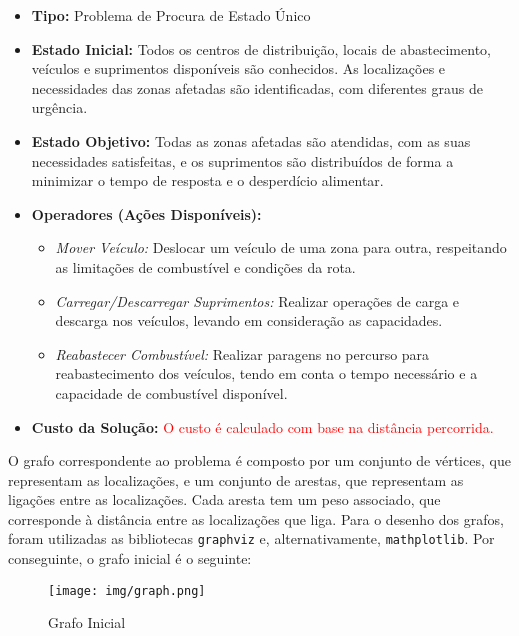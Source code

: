 \documentclass[a4paper,12pt]{scrreprt}
\begin{document}
\begin{itemize}
    \item\textbf{Tipo:} Problema de Procura de Estado Único
    \item\textbf{Estado Inicial:} Todos os centros de distribuição, locais de abastecimento,
    veículos e suprimentos disponíveis são conhecidos.
     As localizações e necessidades das zonas afetadas são identificadas, com diferentes graus de urgência.
    \item\textbf{Estado Objetivo:} Todas as zonas afetadas são atendidas, com as suas necessidades satisfeitas, e os suprimentos
    são distribuídos de forma a minimizar o tempo de resposta e o desperdício alimentar.
        \item\textbf{Operadores (Ações Disponíveis):} 
        \begin{itemize}
                \item\textit{Mover Veículo:} Deslocar um veículo de uma zona para outra, respeitando as limitações de combustível e condições da rota.
                \item\textit{Carregar/Descarregar Suprimentos:} Realizar operações de carga e descarga nos veículos, levando em consideração as capacidades.
                \item\textit{Reabastecer Combustível:} Realizar paragens no percurso para reabastecimento dos veículos, tendo em conta o tempo
                necessário e a capacidade de combustível disponível.
        \end{itemize}
    \item\textbf{Custo da Solução:} \textcolor{red}{O custo é calculado com base na distância percorrida.}
    \end{itemize}

O grafo correspondente ao problema é composto por um conjunto de vértices, que representam as localizações, e um conjunto de arestas,
que representam as ligações entre as localizações. Cada aresta tem um peso associado, que corresponde à distância entre as localizações
que liga. Para o desenho dos grafos, foram utilizadas as bibliotecas \texttt{graphviz} e, alternativamente, \texttt{mathplotlib}.
Por conseguinte, o grafo inicial é o seguinte:

\begin{figure}[ht]
    \centering
    \texttt{[image: img/graph.png]}
    \caption{Grafo Inicial}
    \label{fig:grafo}
\end{figure}

\end{document}
